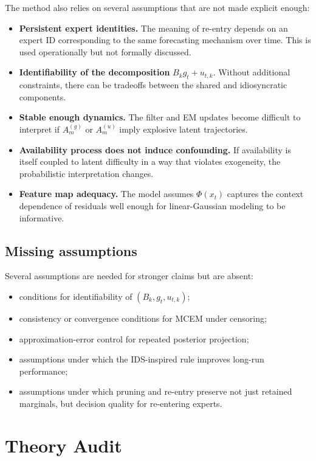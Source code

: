 \documentclass[11pt]{article}
\begin{document}
The method also relies on several assumptions that are not made explicit enough:
\begin{itemize}
    \item \textbf{Persistent expert identities.} The meaning of re-entry depends
    on an expert ID corresponding to the same forecasting mechanism over time.
    This is used operationally but not formally discussed.
    \item \textbf{Identifiability of the decomposition} $B_k g_t + u_{t,k}$.
    Without additional constraints, there can be tradeoffs between the shared and
    idiosyncratic components.
    \item \textbf{Stable enough dynamics.} The filter and EM updates become
    difficult to interpret if $A_m^{(g)}$ or $A_m^{(u)}$ imply explosive latent
    trajectories.
    \item \textbf{Availability process does not induce confounding.} If
    availability is itself coupled to latent difficulty in a way that violates
    exogeneity, the probabilistic interpretation changes.
    \item \textbf{Feature map adequacy.} The model assumes $\Phi(x_t)$ captures
    the context dependence of residuals well enough for linear-Gaussian modeling
    to be informative.
\end{itemize}

\subsection{Missing assumptions}

Several assumptions are needed for stronger claims but are absent:
\begin{itemize}
    \item conditions for identifiability of $(B_k,g_t,u_{t,k})$;
    \item consistency or convergence conditions for MCEM under censoring;
    \item approximation-error control for repeated posterior projection;
    \item assumptions under which the IDS-inspired rule improves long-run
    performance;
    \item assumptions under which pruning and re-entry preserve not just retained
    marginals, but decision quality for re-entering experts.
\end{itemize}

\section{Theory Audit}
\end{document}

